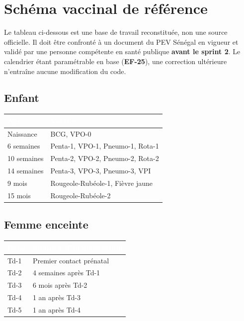 \documentclass[11pt,a4paper]{article}
\newcommand{\rid}[1]{{\sffamily\bfseries\footnotesize\color{primary}#1}}
\newcommand{\hd}[1]{\textcolor{white}{\sffamily\bfseries\small #1}}
\newcommand{\rowhead}{\rowcolor{primary}}
\begin{document}
\section{Schéma vaccinal de référence}

\begin{avertissement}
Le tableau ci-dessous est une base de travail reconstituée, non une source officielle. Il
doit être confronté à un document du PEV Sénégal en vigueur et validé par une personne
compétente en santé publique \textbf{avant le sprint 2}. Le calendrier étant paramétrable
en base (\rid{EF-25}), une correction ultérieure n'entraîne aucune modification du code.
\end{avertissement}

\subsection*{Enfant}

\noindent
\begin{tabularx}{\textwidth}{@{}R{3.4cm} L@{}}
\toprule
\rowhead \hd{Âge} & \hd{Vaccins} \\
\midrule
Naissance & BCG, VPO-0 \\
6 semaines & Penta-1, VPO-1, Pneumo-1, Rota-1 \\
10 semaines & Penta-2, VPO-2, Pneumo-2, Rota-2 \\
14 semaines & Penta-3, VPO-3, Pneumo-3, VPI \\
9 mois & Rougeole-Rubéole-1, Fièvre jaune \\
15 mois & Rougeole-Rubéole-2 \\
\bottomrule
\end{tabularx}

\subsection*{Femme enceinte}

\noindent
\begin{tabularx}{\textwidth}{@{}R{3.4cm} L@{}}
\toprule
\rowhead \hd{Rang} & \hd{Moment d'administration} \\
\midrule
Td-1 & Premier contact prénatal \\
Td-2 & 4 semaines après Td-1 \\
Td-3 & 6 mois après Td-2 \\
Td-4 & 1 an après Td-3 \\
Td-5 & 1 an après Td-4 \\
\bottomrule
\end{tabularx}
\end{document}
